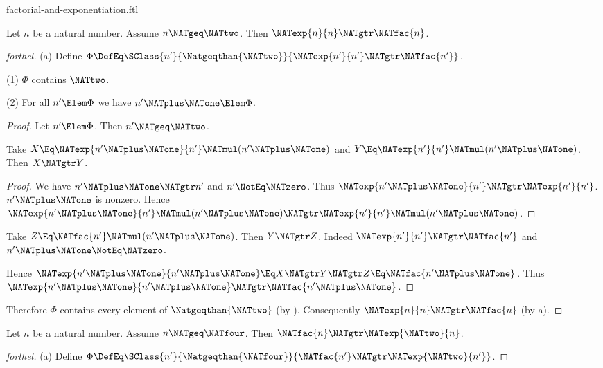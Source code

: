 \documentclass{stex}
\begin{document}
\begin{smodule}{factorial-and-exponentiation.ftl}

\begin{proposition}[forthel]
  Let $n$ be a natural number.
  Assume $n \NATgeq \NATtwo$.
  Then $\NATexp{n}{n} \NATgtr \NATfac{n}$.
\end{proposition}
\begin{proof}[forthel]
  (a) Define $\Phi \DefEq \SClass{n'}{\Natgeqthan{\NATtwo}}{\NATexp{n'}{n'} \NATgtr \NATfac{n'}}$.

  (1) $\Phi$ contains $\NATtwo$.

  (2) For all $n' \Elem \Phi$ we have $n' \NATplus \NATone \Elem \Phi$.
  \begin{proof}
    Let $n' \Elem \Phi$.
    Then $n' \NATgeq \NATtwo$.

    Take $X \Eq \NATexp{n' \NATplus \NATone}{n'} \NATmul (n' \NATplus \NATone)$ and $Y \Eq \NATexp{n'}{n'} \NATmul (n' \NATplus \NATone)$.
    Then $X \NATgtr Y$.
    \begin{proof}
      We have $n' \NATplus \NATone \NATgtr n'$ and $n' \NotEq \NATzero$.
      Thus $\NATexp{n' \NATplus \NATone}{n'} \NATgtr \NATexp{n'}{n'}$.
      $n' \NATplus \NATone$ is nonzero.
      Hence $\NATexp{n' \NATplus \NATone}{n'} \NATmul (n' \NATplus \NATone) \NATgtr \NATexp{n'}{n'} \NATmul (n' \NATplus \NATone)$.
    \end{proof}

    Take $Z \Eq \NATfac{n'} \NATmul (n' \NATplus \NATone)$.
    Then $Y \NATgtr Z$.
    Indeed $\NATexp{n'}{n'} \NATgtr \NATfac{n'}$ and $n' \NATplus \NATone \NotEq \NATzero$.

    Hence $\NATexp{n' \NATplus \NATone}{n' \NATplus \NATone} \Eq X \NATgtr Y \NATgtr Z \Eq \NATfac{n' \NATplus \NATone}$.
    Thus $\NATexp{n' \NATplus \NATone}{n' \NATplus \NATone} \NATgtr \NATfac{n' \NATplus \NATone}$.
  \end{proof}

  Therefore $\Phi$ contains every element of $\Natgeqthan{\NATtwo}$ (by ).
  Consequently $\NATexp{n}{n} \NATgtr \NATfac{n}$ (by a).
\end{proof}

\begin{proposition}[forthel]
  Let $n$ be a natural number.
  Assume $n \NATgeq \NATfour$.
  Then $\NATfac{n} \NATgtr \NATexp{\NATtwo}{n}$.
\end{proposition}
\begin{proof}[forthel]
  (a) Define $\Phi \DefEq \SClass{n'}{\Natgeqthan{\NATfour}}{\NATfac{n'} \NATgtr \NATexp{\NATtwo}{n'}}$.


\end{proof}
\end{smodule}
\end{document}
